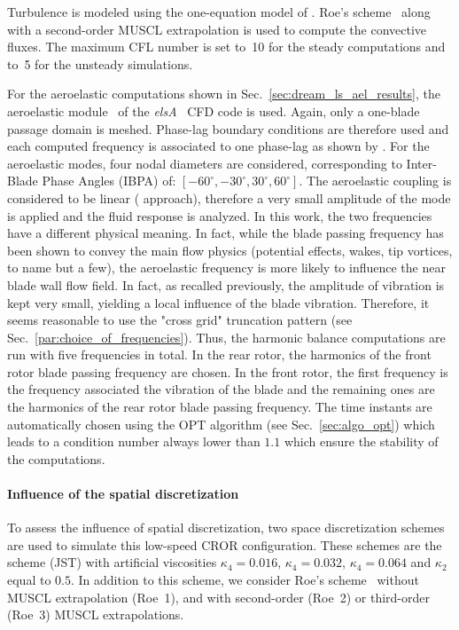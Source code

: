 Turbulence is modeled using the one-equation model of
\citet{Spalart1992}.  Roe's scheme~\cite{Roe1981} along with a 
second-order MUSCL extrapolation 
is used to compute the convective fluxes.
The maximum CFL number is set to~10 for the steady 
computations and to~5 for the unsteady simulations.

For the aeroelastic computations shown in
Sec.~\ref{sec:dream_ls_ael_results}, 
the aeroelastic module~\cite{CIDugeai2011} 
of the \textit{elsA}~\cite{Cambier2013} CFD code is used.
Again, only a one-blade passage domain is meshed.
Phase-lag boundary conditions are therefore used
and each computed frequency is associated to one phase-lag
as shown by \citet{ThesisGuedeney}.
For the aeroelastic modes, 
four nodal diameters are considered, corresponding to Inter-Blade
Phase Angles (IBPA) of: $[-60^\circ, -30^\circ, 30^\circ, 60^\circ]$. 
The aeroelastic coupling is considered to be linear (
approach), therefore a very small amplitude of the mode is applied
and the fluid response is analyzed.
In this work, the two frequencies 
have a different physical meaning. In fact, while the blade passing frequency
has been shown to convey the main flow physics (potential effects, wakes, 
tip vortices, to name but a few), the aeroelastic frequency is more likely
to influence the near blade wall flow field. In fact, as recalled
previously, the amplitude of vibration is kept very small,
yielding a local influence of the blade vibration.
Therefore, it seems reasonable to use the "cross grid"
truncation pattern (see Sec.~\ref{par:choice_of_frequencies}).
Thus, the harmonic balance computations are run with
five frequencies in total. In the rear rotor,
the harmonics of the front rotor blade passing frequency
are chosen. In the front rotor, the first frequency is the
frequency associated  the vibration of the blade and the
remaining ones are the harmonics of the rear rotor blade 
passing frequency.
The time instants are automatically chosen using the OPT
algorithm (see Sec.~\ref{sec:algo_opt}) which leads to 
a condition number always lower than $1.1$ which ensure
the stability of the computations.

\paragraph{Influence of the spatial discretization}
\label{sub:dream_ls_spatial_discretization}

To assess the influence of spatial discretization, two 
space discretization schemes are used to simulate this low-speed CROR configuration.
These schemes are the \citet{Jameson1981} scheme (JST)  with artificial
viscosities $\kappa_4 = 0.016$, $\kappa_4 = 0.032$, $\kappa_4 = 0.064$
and $\kappa_2$ equal to $0.5$. In addition to this scheme, we consider
Roe's scheme~\cite{Roe1981} without MUSCL extrapolation (Roe~1),
and with second-order (Roe~2) or third-order (Roe~3) 
MUSCL extrapolations.

